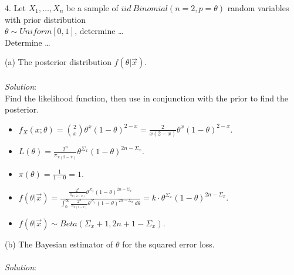 \documentclass[12pt]{article}
\newcommand{\XB}{\color{black}}
\newcommand{\XBB}{\color{blue}}
\newcommand{\ds}{\displaystyle}
\begin{document}
4. Let $ X_{1}, \dots , X_{n} $ be a sample of $ iid \ Binomial(n = 2, p = \theta) $ random variables
with prior distribution \\ $ \theta \sim Uniform[0, 1] $, determine \dots \\

Determine \dots \\

\XBB\hrulefill\XB
\vspace{5mm}

(a) The posterior distribution $ f(\theta | \overrightarrow{x}) $. \\
\vspace{2.5mm} \\
\textit{Solution}:
\vspace{2.5mm} \\

\noindent
Find the likelihood function, then use in conjunction with the prior to find the posterior. \\

\begin{itemize}
    \item $ \ds f_X(x ; \theta) =  \binom{2}{x} \theta^{x} (1 - \theta)^{2 - x} = \frac{2}{x(2 - x)} \theta^{x} (1 - \theta)^{2 - x} $. \\
    \item $ \ds L(\theta) = \frac{2^{n}}{\pi_{x(2 - x)}} \theta^{\Sigma_{x}} (1 - \theta)^{2n - \Sigma_{x}} $. \\
    \item $ \ds \pi(\theta) = \frac{ 1 }{ 1 - 0 } = 1 $. \\
    \item $ \ds f(\theta | \overrightarrow{x}) = \frac{ \ds \frac{2^{n}}{\pi_{x(2 - x)}} \theta^{\Sigma_{x}} (1 - \theta)^{2n - \Sigma_{x}} }{ \ds \int_{0}^{\infty} \frac{2^{n}}{\pi_{x(2 - x)}} \theta^{\Sigma_{x}} (1 - \theta)^{2n - \Sigma_{x}} \, d\theta } =
    k \cdot \theta^{\Sigma_{x}} (1 - \theta)^{2n - \Sigma_{x}} $. \\
    \item $ \ds f(\theta | \overrightarrow{x}) \sim Beta(\Sigma_{x} + 1, 2n + 1 - \Sigma_{x}) $. \\
\end{itemize}

\vspace{2.5mm}

(b) The Bayesian estimator of $ \theta $ for the squared error loss. \\
\vspace{2.5mm} \\
\textit{Solution}:
\vspace{2.5mm} \\
\end{document}
